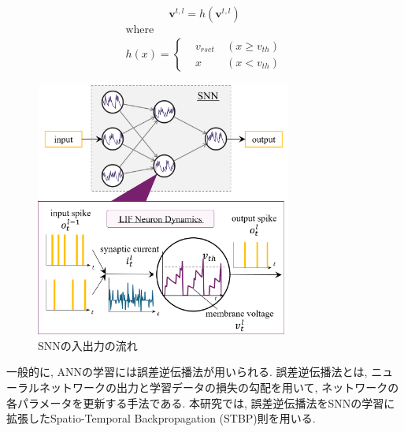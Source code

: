 \begin{equation}
  \bm{v}^{t, l}=h\left(\bm{v}^{t, l}\right)
  \label{eq:outputSpike2:1}
\end{equation}
\begin{equation}
  \begin{split}
    \text{where} \hspace{3cm}\ \\
    h\left(x\right)=\left\{
      \begin{alignedat}{2}
        &v_{rset} &\:\left(x{\geq}v_{th}\right)\\
        &x &\:\left(x{<}v_{th}\right)
      \end{alignedat}
  \right. 
  \end{split} \label{eq:outputSpike2:2}
\end{equation}


\begin{figure}[htb]
    \centering
    \includegraphics[width=0.75\textwidth]{Static/chap2_sec1_snn.png}
    \caption{SNNの入出力の流れ}
    \label{fig:snn:inoutflow}
\end{figure}

一般的に, ANNの学習には誤差逆伝播法が用いられる.
誤差逆伝播法とは, ニューラルネットワークの出力と学習データの損失の勾配を用いて, ネットワークの各パラメータを更新する手法である.
本研究では, 誤差逆伝播法をSNNの学習に拡張したSpatio-Temporal Backpropagation (STBP)則\cite{stbp}を用いる.
